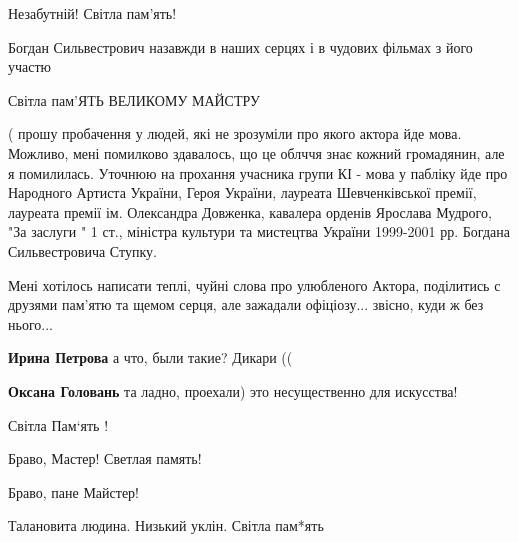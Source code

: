 \begin{itemize}
Незабутній! Світла пам'ять!

Богдан Сильвестрович назавжди в наших серцях і в чудових фільмах з його участю

Світла пам'ЯТЬ ВЕЛИКОМУ МАЙСТРУ


( прошу пробачення у людей, які не зрозуміли про якого актора йде мова.
Можливо, мені помилково здавалось, що це облччя знає кожний громадянин, але я
помилилась. Уточнюю на прохання учасника групи КІ - мова у пабліку йде про
Народного Артиста України, Героя України, лауреата Шевченківської премії,
лауреата премії ім. Олександра Довженка, кавалера орденів Ярослава Мудрого, "За
заслуги " 1 ст., міністра культури та мистецтва України 1999-2001 рр. Богдана
Сильвестровича Ступку.

Мені хотілось написати теплі, чуйні слова про улюбленого Актора, поділитись с
друзями пам'ятю та щемом серця, але зажадали офіціозу... звісно, куди ж без
нього...

\begin{itemize} %
\textbf{Ирина Петрова} а что, были такие? Дикари ((

\textbf{Оксана Головань} та ладно, проехали) это несущественно для искусства!
\end{itemize} %

Світла Пам‘ять !

Браво, Мастер! Светлая память!

Браво, пане Майстер!

Талановита людина. Низький уклін. Світла пам*ять

\end{itemize} %
